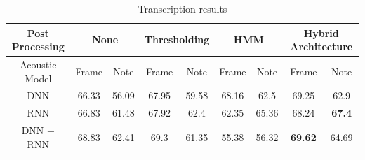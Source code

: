 \documentclass{article}
\begin{document}
\begin{table}[htpb]
\begin{center}
  \begin{tabular}{|c| c  c | c  c | c  c | c c|}
    \hline
    Post Processing& \multicolumn{2}{|c|}{None}&\multicolumn{2}{c|}{Thresholding}&\multicolumn{2}{c|}{HMM}&\multicolumn{2}{c|}{Hybrid Architecture}\\ \hline
    Acoustic Model& Frame & Note & Frame & Note & Frame & Note & Frame & Note \\ \hline
    DNN & 66.33 & 56.09 & 67.95 &59.58 &68.16 & 62.5 & 69.25 & 62.9 \\ \hline
    RNN & 66.83 & 61.48 & 67.92 & 62.4 & 62.35 & 65.36 &68.24 & \textbf{67.4} \\ \hline
    DNN + RNN & 68.83 &62.41 &69.3 &61.35 & 55.38 & 56.32 & \textbf{69.62} &64.69 \\ \hline
  \end{tabular}%
\end{center}
\vspace{-1.8em}\caption{Transcription results}
\end{table}
\end{document}
